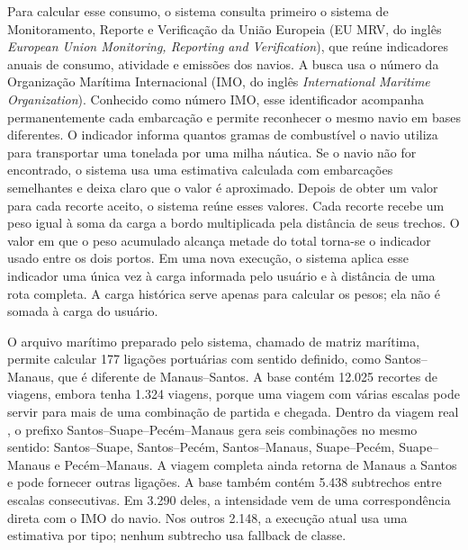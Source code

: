 \documentclass[12pt,a4paper,oneside]{report}
\newcommand{\codecell}[1]{\texttt{\seqsplit{#1}}}
\begin{document}
Para calcular esse consumo, o sistema consulta primeiro o sistema de Monitoramento, Reporte e Verificação da União Europeia (EU MRV, do inglês \textit{European Union Monitoring, Reporting and Verification}), que reúne indicadores anuais de consumo, atividade e emissões dos navios. A busca usa o número da Organização Marítima Internacional (IMO, do inglês \textit{International Maritime Organization}). Conhecido como número IMO, esse identificador acompanha permanentemente cada embarcação e permite reconhecer o mesmo navio em bases diferentes. O indicador informa quantos gramas de combustível o navio utiliza para transportar uma tonelada por uma milha náutica. Se o navio não for encontrado, o sistema usa uma estimativa calculada com embarcações semelhantes e deixa claro que o valor é aproximado. Depois de obter um valor para cada recorte aceito, o sistema reúne esses valores. Cada recorte recebe um peso igual à soma da carga a bordo multiplicada pela distância de seus trechos. O valor em que o peso acumulado alcança metade do total torna-se o indicador usado entre os dois portos. Em uma nova execução, o sistema aplica esse indicador uma única vez à carga informada pelo usuário e à distância de uma rota completa. A carga histórica serve apenas para calcular os pesos; ela não é somada à carga do usuário.

O arquivo marítimo preparado pelo sistema, chamado de matriz marítima, permite calcular 177 ligações portuárias com sentido definido, como Santos--Manaus, que é diferente de Manaus--Santos. A base contém 12.025 recortes de viagens, embora tenha 1.324 viagens, porque uma viagem com várias escalas pode servir para mais de uma combinação de partida e chegada. Dentro da viagem real \codecell{voyage\_9612791\_00011}, o prefixo Santos--Suape--Pecém--Manaus gera seis combinações no mesmo sentido: Santos--Suape, Santos--Pecém, Santos--Manaus, Suape--Pecém, Suape--Manaus e Pecém--Manaus. A viagem completa ainda retorna de Manaus a Santos e pode fornecer outras ligações. A base também contém 5.438 subtrechos entre escalas consecutivas. Em 3.290 deles, a intensidade vem de uma correspondência direta com o IMO do navio. Nos outros 2.148, a execução atual usa uma estimativa por tipo; nenhum subtrecho usa fallback de classe.
\end{document}
